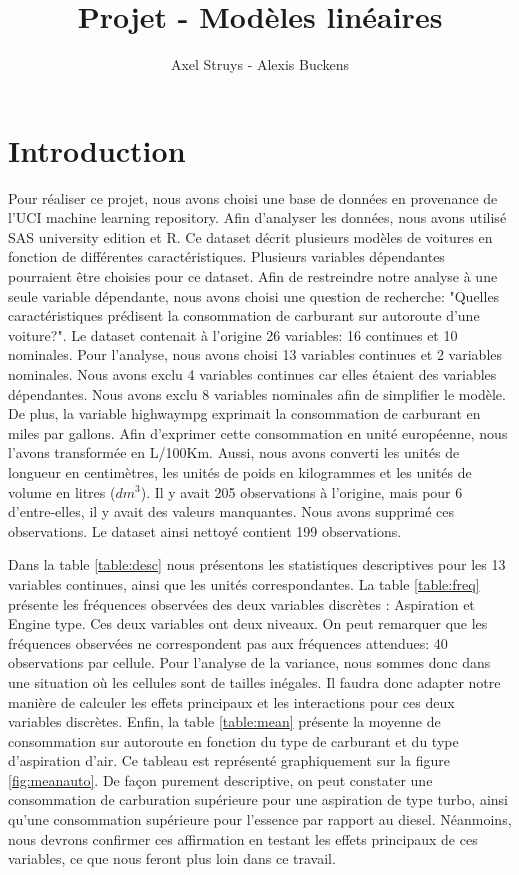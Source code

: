 \documentclass[11pt,a4paper]{article}
\author{Axel Struys - Alexis Buckens}
\title{Projet - Modèles linéaires}
\begin{document}
\maketitle
\section{Introduction}
Pour réaliser ce projet, nous avons choisi une base de données en provenance de l'UCI machine learning repository. Afin d'analyser les données, nous avons utilisé SAS university edition et R.
Ce dataset décrit plusieurs modèles de voitures en fonction de différentes caractéristiques. Plusieurs variables dépendantes pourraient être choisies pour ce dataset. Afin de restreindre notre analyse à une seule variable dépendante, nous avons choisi une question de recherche: "Quelles caractéristiques prédisent la consommation de carburant sur autoroute d'une voiture?".
Le dataset contenait à l'origine 26 variables: 16 continues et 10 nominales. Pour l'analyse, nous avons choisi 13 variables continues et 2 variables nominales. Nous avons exclu 4 variables continues car elles étaient des variables dépendantes. Nous avons exclu 8 variables nominales afin de simplifier le modèle. De plus, la variable highwaympg exprimait la consommation de carburant en miles par gallons. Afin d'exprimer cette consommation en unité européenne, nous l'avons transformée en L/100Km. Aussi, nous avons converti les unités de longueur en centimètres, les unités de poids en kilogrammes et les unités de volume en litres ($dm^{3}$).
Il y avait 205 observations à l'origine, mais pour 6 d'entre-elles, il y avait des valeurs manquantes. Nous avons supprimé ces observations. Le dataset ainsi nettoyé contient 199 observations.

Dans la table \ref{table:desc} nous présentons les statistiques descriptives pour les 13 variables continues, ainsi que les unités correspondantes. La table \ref{table:freq} présente les fréquences observées des deux variables discrètes : Aspiration et Engine type. Ces deux variables ont deux niveaux. On peut remarquer que les fréquences observées ne correspondent pas aux fréquences attendues: 40 observations par cellule. Pour l'analyse de la variance, nous sommes donc dans une situation où les cellules sont de tailles inégales. Il faudra donc adapter notre manière de calculer les effets principaux et les interactions pour ces deux variables discrètes.
Enfin, la table \ref{table:mean} présente la moyenne de consommation sur autoroute en fonction du type de carburant et du type d'aspiration d'air.
Ce tableau est représenté graphiquement sur la figure \ref{fig:meanauto}. De façon purement descriptive, on peut constater une consommation de carburation supérieure pour une aspiration de type turbo, ainsi qu'une consommation supérieure pour l'essence par rapport au diesel. Néanmoins,  nous devrons confirmer ces affirmation en testant les effets principaux de ces variables, ce que nous feront plus loin dans ce travail.
\end{document}
